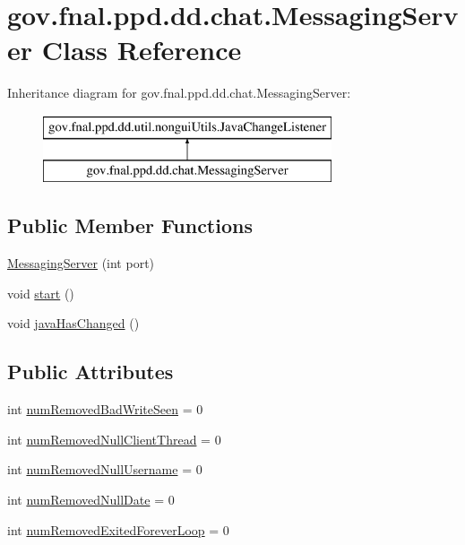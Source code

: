 \hypertarget{classgov_1_1fnal_1_1ppd_1_1dd_1_1chat_1_1MessagingServer}{\section{gov.\-fnal.\-ppd.\-dd.\-chat.\-Messaging\-Server Class Reference}
\label{classgov_1_1fnal_1_1ppd_1_1dd_1_1chat_1_1MessagingServer}
}
Inheritance diagram for gov.\-fnal.\-ppd.\-dd.\-chat.\-Messaging\-Server\-:\begin{figure}[H]
\begin{center}
\leavevmode
\includegraphics[height=2.000000cm]{classgov_1_1fnal_1_1ppd_1_1dd_1_1chat_1_1MessagingServer}
\end{center}
\end{figure}
\subsection*{Public Member Functions}
\begin{DoxyCompactItemize}
\item 
\hyperlink{classgov_1_1fnal_1_1ppd_1_1dd_1_1chat_1_1MessagingServer_a9b02c801edad834dcc2a0c96071900af}{Messaging\-Server} (int port)
\item 
void \hyperlink{classgov_1_1fnal_1_1ppd_1_1dd_1_1chat_1_1MessagingServer_a69cf69b0f944a33ba7e1b9c32dd60ee6}{start} ()
\item 
void \hyperlink{classgov_1_1fnal_1_1ppd_1_1dd_1_1chat_1_1MessagingServer_a8ca524f1db3320d40d3e5c0144802765}{java\-Has\-Changed} ()
\end{DoxyCompactItemize}
\subsection*{Public Attributes}
\begin{DoxyCompactItemize}
\item 
int \hyperlink{classgov_1_1fnal_1_1ppd_1_1dd_1_1chat_1_1MessagingServer_ae9c73322e842357c87634a60426e5bf0}{num\-Removed\-Bad\-Write\-Seen} = 0
\item 
int \hyperlink{classgov_1_1fnal_1_1ppd_1_1dd_1_1chat_1_1MessagingServer_a3fe04e43605b1c81c063cf9d334fb763}{num\-Removed\-Null\-Client\-Thread} = 0
\item 
int \hyperlink{classgov_1_1fnal_1_1ppd_1_1dd_1_1chat_1_1MessagingServer_a84d7bc143f1eee20c7e39ce9024783c9}{num\-Removed\-Null\-Username} = 0
\item 
int \hyperlink{classgov_1_1fnal_1_1ppd_1_1dd_1_1chat_1_1MessagingServer_ab986fa29bcdc51bd186ad23e1c699426}{num\-Removed\-Null\-Date} = 0
\item 
int \hyperlink{classgov_1_1fnal_1_1ppd_1_1dd_1_1chat_1_1MessagingServer_a189ff6081d21eb1a9c98887d84e23b17}{num\-Removed\-Exited\-Forever\-Loop} = 0
\end{DoxyCompactItemize}
